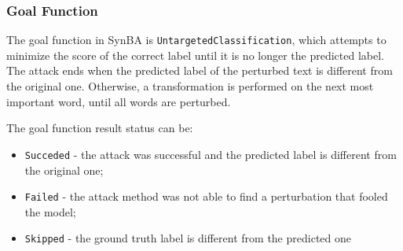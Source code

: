 \subsubsection{Goal Function}\label{subsubsec:goal-function}

The goal function in SynBA is \texttt{UntargetedClassification}, which attempts to minimize the score of the correct label until it is no longer the predicted label.
The attack ends when the predicted label of the perturbed text is different from the original one.
Otherwise, a transformation is performed on the next most important word, until all words are perturbed.

The goal function result status can be:
\begin{itemize}
    \item \texttt{Succeded} - the attack was successful and the predicted label is different from the original one;
    \item \texttt{Failed} - the attack method was not able to find a perturbation that fooled the model;
    \item \texttt{Skipped} - the ground truth label is different from the predicted one
\end{itemize}




